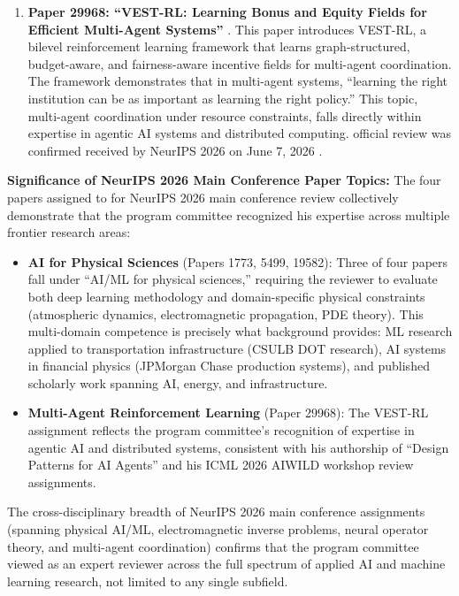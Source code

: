 \begin{enumerate}
    \item \textbf{Paper 29968: ``VEST-RL: Learning Bonus and Equity Fields for Efficient Multi-Agent Systems''} \cite{JR44}. This paper introduces VEST-RL, a bilevel reinforcement learning framework that learns graph-structured, budget-aware, and fairness-aware incentive fields for multi-agent coordination. The framework demonstrates that in multi-agent systems, ``learning the right institution can be as important as learning the right policy.'' This topic, multi-agent coordination under resource constraints, falls directly within \drs expertise in agentic AI systems and distributed computing. \drs official review was confirmed received by NeurIPS 2026 on June 7, 2026 \cite{JR45}.
\end{enumerate}

\textbf{Significance of NeurIPS 2026 Main Conference Paper Topics:} The four papers assigned to \dr for NeurIPS 2026 main conference review collectively demonstrate that the program committee recognized his expertise across multiple frontier research areas:

\begin{itemize}
    \item \textbf{AI for Physical Sciences} (Papers 1773, 5499, 19582): Three of four papers fall under ``AI/ML for physical sciences,'' requiring the reviewer to evaluate both deep learning methodology and domain-specific physical constraints (atmospheric dynamics, electromagnetic propagation, PDE theory). This multi-domain competence is precisely what \drs background provides: ML research applied to transportation infrastructure (CSULB DOT research), AI systems in financial physics (JPMorgan Chase production systems), and published scholarly work spanning AI, energy, and infrastructure.
    \item \textbf{Multi-Agent Reinforcement Learning} (Paper 29968): The VEST-RL assignment reflects the program committee's recognition of \drs expertise in agentic AI and distributed systems, consistent with his authorship of ``Design Patterns for AI Agents'' and his ICML 2026 AIWILD workshop review assignments.
\end{itemize}

The cross-disciplinary breadth of \drs NeurIPS 2026 main conference assignments (spanning physical AI/ML, electromagnetic inverse problems, neural operator theory, and multi-agent coordination) confirms that the program committee viewed \dr as an expert reviewer across the full spectrum of applied AI and machine learning research, not limited to any single subfield.

